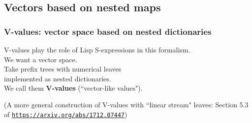 \documentclass{beamer}
\newcommand{\msmagenta}[1]{{\color{mymagenta} #1}}
\begin{document}
\subsection{Vectors based on nested maps}


\begin{frame}

  \frametitle{\msmagenta{V-values: vector space based on nested dictionaries}}


V-values play the role of Lisp S-expressions in this formalism.\\[3ex]


We want a vector space.\\[3ex]

Take prefix trees with numerical leaves\\ implemented as nested dictionaries.\\[3ex]

We call them {\bf V-values}
(``vector-like values").\\[3ex]

\hrulefill

(A more general construction of V-values with ``linear stream" leaves:  Section 5.3 of \href{https://arxiv.org/abs/1712.07447}{\tt\footnotesize  https://arxiv.org/abs/1712.07447})

\end{frame}
\end{document}
